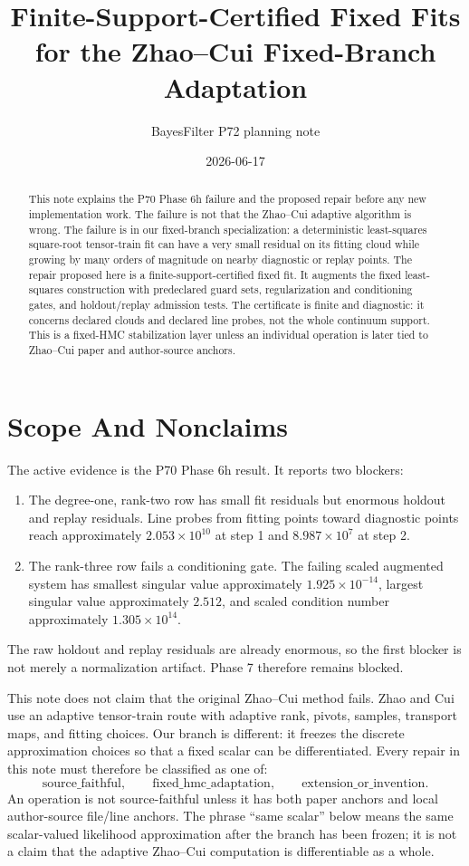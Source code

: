 \documentclass[11pt]{article}
\title{Finite-Support-Certified Fixed Fits for the Zhao--Cui Fixed-Branch Adaptation}
\author{BayesFilter P72 planning note}
\date{2026-06-17}
\begin{document}
\maketitle

\begin{abstract}
This note explains the P70 Phase 6h failure and the proposed repair before any
new implementation work.  The failure is not that the Zhao--Cui adaptive
algorithm is wrong.  The failure is in our fixed-branch specialization: a
deterministic least-squares square-root tensor-train fit can have a very small
residual on its fitting cloud while growing by many orders of magnitude on
nearby diagnostic or replay points.  The repair proposed here is a
finite-support-certified fixed fit.  It augments the fixed least-squares
construction with predeclared guard sets, regularization and conditioning
gates, and holdout/replay admission tests.  The certificate is finite and
diagnostic: it concerns declared clouds and declared line probes, not the whole
continuum support.  This is a fixed-HMC stabilization layer unless an
individual operation is later tied to Zhao--Cui paper and author-source
anchors.
\end{abstract}

\section{Scope And Nonclaims}

The active evidence is the P70 Phase 6h result.  It reports two blockers:
\begin{enumerate}[leftmargin=2em]
    \item The degree-one, rank-two row has small fit residuals but enormous
    holdout and replay residuals.  Line probes from fitting points toward
    diagnostic points reach approximately \(2.053\times 10^{10}\) at step 1
    and \(8.987\times 10^7\) at step 2.
    \item The rank-three row fails a conditioning gate.  The failing scaled
    augmented system has smallest singular value approximately
    \(1.925\times 10^{-14}\), largest singular value approximately \(2.512\),
    and scaled condition number approximately \(1.305\times 10^{14}\).
\end{enumerate}
The raw holdout and replay residuals are already enormous, so the first
blocker is not merely a normalization artifact.  Phase 7 therefore remains
blocked.

This note does not claim that the original Zhao--Cui method fails.  Zhao and
Cui use an adaptive tensor-train route with adaptive rank, pivots, samples,
transport maps, and fitting choices.  Our branch is different: it freezes the
discrete approximation choices so that a fixed scalar can be differentiated.
Every repair in this note must therefore be classified as one of:
\[
    \text{source\_faithful},\qquad
    \text{fixed\_hmc\_adaptation},\qquad
    \text{extension\_or\_invention}.
\]
An operation is not source-faithful unless it has both paper anchors and local
author-source file/line anchors.  The phrase ``same scalar'' below means the
same scalar-valued likelihood approximation after the branch has been frozen;
it is not a claim that the adaptive Zhao--Cui computation is differentiable as
a whole.
\end{document}
